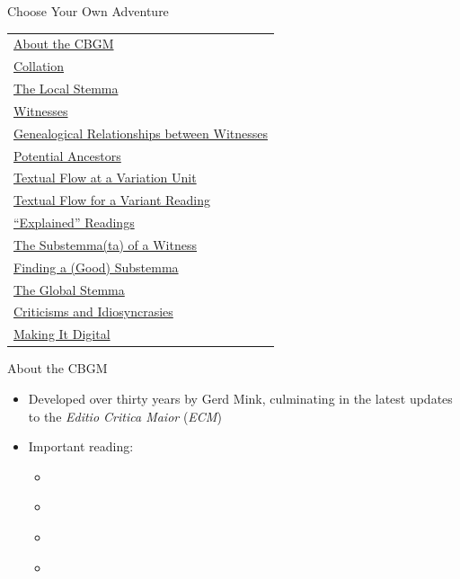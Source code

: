 \documentclass[10pt]{beamer}
\begin{document}
	\begin{frame}{Choose Your Own Adventure}\label{slide:crossroad}
		\begin{table}
			\centering
			\small
			\begin{tabular}{l}
				\hyperlink{slide:about}{About the CBGM}\\
				\hyperlink{slide:collation}{Collation}\\
				\hyperlink{slide:local-stemma}{The Local Stemma}\\
				\hyperlink{slide:witnesses}{Witnesses}\\
				\hyperlink{slide:genealogical-relationships}{Genealogical Relationships between Witnesses}\\
				\hyperlink{slide:potential-ancestors}{Potential Ancestors}\\
				\hyperlink{slide:textual-flow-unit}{Textual Flow at a Variation Unit}\\
				\hyperlink{slide:textual-flow-reading}{Textual Flow for a Variant Reading}\\
				\hyperlink{slide:explained-readings}{``Explained'' Readings}\\
				\hyperlink{slide:substemma}{The Substemma(ta) of a Witness}\\
				\hyperlink{slide:substemma-search}{Finding a (Good) Substemma}\\
				\hyperlink{slide:global-stemma}{The Global Stemma}\\
				\hyperlink{slide:criticisms}{Criticisms and Idiosyncrasies}\\
				\hyperlink{slide:making-it-digital}{Making It Digital}\\
			\end{tabular}
		\end{table}
	\end{frame}
	\begin{frame}{About the CBGM}\label{slide:about}
		\begin{itemize}
			\item Developed over thirty years by Gerd Mink, culminating in the latest updates to the \emph{Editio Critica Maior} (\emph{ECM})
			\item Important reading:
			\begin{itemize} 
				\item \cite{Mink04}
				\item \cite{Gurry17}
				\item \cite{WG17}
				\item \cite{Edmondson19}
			\end{itemize}
		\end{itemize}
	\end{frame}
\end{document}
